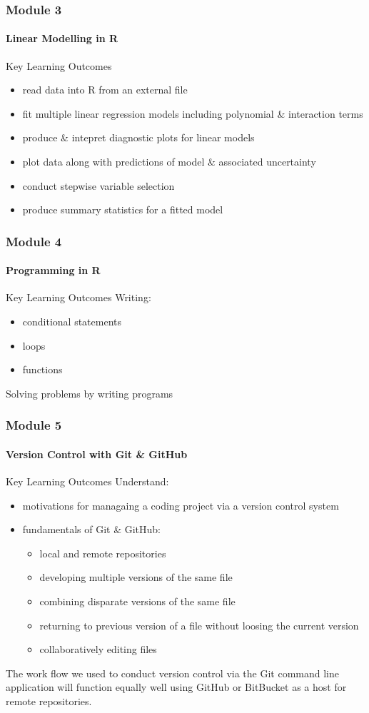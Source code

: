 \documentclass[xcolor=dvipsnames]{beamer}
\begin{document}
\begin{frame}
\frametitle{Module 3}
\framesubtitle{Linear Modelling in R}
\begin{block}{Key Learning Outcomes}
\begin{itemize}
\item read data into R from an external file
\item fit multiple linear regression models including polynomial \& interaction terms
\item produce \& intepret diagnostic plots for linear models
\item plot data along with predictions of model \& associated uncertainty
\item conduct stepwise variable selection
\item produce summary statistics for a fitted model
\end{itemize}
\end{block}
\end{frame}

\begin{frame}
\frametitle{Module 4}
\framesubtitle{Programming in R}
\begin{block}{Key Learning Outcomes}
Writing:
\begin{itemize}
\item conditional statements
\item loops
\item functions
\newline
\end{itemize}
Solving problems by writing programs
\end{block}
\end{frame}

\begin{frame}
\frametitle{Module 5}
\framesubtitle{Version Control with Git \& GitHub}
\begin{block}{Key Learning Outcomes}
Understand:
\begin{itemize}
\item motivations for managaing a coding project via a version control system
\item fundamentals of Git \& GitHub: \begin{itemize}
  \item local and remote repositories
  \item developing multiple versions of the same file
  \item combining disparate versions of the same file
  \item returning to previous version of a file without loosing the current version
  \item collaboratively editing files
  \end{itemize}
\end{itemize}
\end{block}
The work flow we used to conduct version control via the Git command line application will function equally well using GitHub or BitBucket as a host for remote repositories.
\end{frame}
\end{document}
